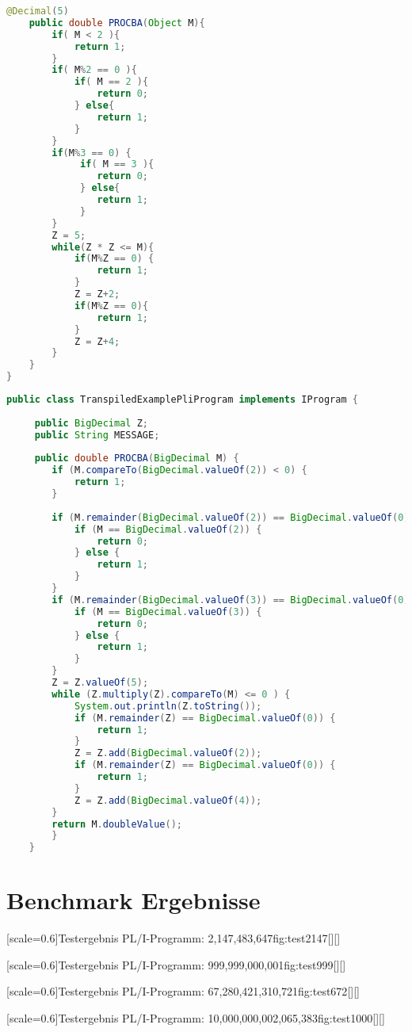 \begin{appendices}
\begin{lstlisting}[language=Java, caption=Übersetzes Java-Primzahlen Programm, label={lst:javaprobedivision}]
	@Decimal(5)
	public double PROCBA(Object M){
		if( M < 2 ){
			return 1;
		}
		if( M%2 == 0 ){
			if( M == 2 ){
				return 0;
			} else{ 
				return 1;
			}
		} 
		if(M%3 == 0) {
			 if( M == 3 ){
			 	return 0;
			 } else{ 
			 	return 1;
			 }
		}
		Z = 5;
		while(Z * Z <= M){ 
			if(M%Z == 0) {
				return 1;
			}
			Z = Z+2;
			if(M%Z == 0){
				return 1;
			}
			Z = Z+4;
		}
	}
}
\end{lstlisting}
\pagebreak
	\begin{lstlisting}[language=Java, caption=Angepasstes Java-Primzahlen Programm, label={lst:javaprobedivisionang}]
	public class TranspiledExamplePliProgram implements IProgram {
	
	 public BigDecimal Z;
	 public String MESSAGE;
	
	 public double PROCBA(BigDecimal M) {
	 	if (M.compareTo(BigDecimal.valueOf(2)) < 0) {
	 		return 1;
	 	}
		
		if (M.remainder(BigDecimal.valueOf(2)) == BigDecimal.valueOf(0)) {
			if (M == BigDecimal.valueOf(2)) {
				return 0;
			} else {
				return 1;
			}
		}
		if (M.remainder(BigDecimal.valueOf(3)) == BigDecimal.valueOf(0)) {
			if (M == BigDecimal.valueOf(3)) {
				return 0;
			} else {
				return 1;
			}
		}
		Z = Z.valueOf(5);
		while (Z.multiply(Z).compareTo(M) <= 0 ) {
			System.out.println(Z.toString());
			if (M.remainder(Z) == BigDecimal.valueOf(0)) {
				return 1;
			}
			Z = Z.add(BigDecimal.valueOf(2));
			if (M.remainder(Z) == BigDecimal.valueOf(0)) {
				return 1;
			}
			Z = Z.add(BigDecimal.valueOf(4));
		}
		return M.doubleValue();
		}
	}
	\end{lstlisting}
\pagebreak
\section{Benchmark Ergebnisse}

[scale=0.6]{Testergebnis PL/I-Programm: 2,147,483,647}{fig:test2147}[][]

[scale=0.6]{Testergebnis PL/I-Programm: 999,999,000,001}{fig:test999}[][]

[scale=0.6]{Testergebnis PL/I-Programm: 67,280,421,310,721}{fig:test672}[][]

[scale=0.6]{Testergebnis PL/I-Programm: 10,000,000,002,065,383}{fig:test1000}[][]


\end{appendices}

